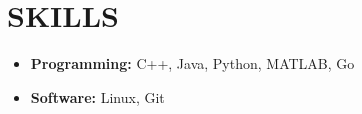 \documentclass[letterpaper,9pt]{extarticle}
\begin{document}
\section*{SKILLS}
\begin{itemize}
	\item \textbf{Programming:} C++, Java, Python, MATLAB, Go
	\item \textbf{Software:} Linux, Git
\end{itemize}

\end{document}
